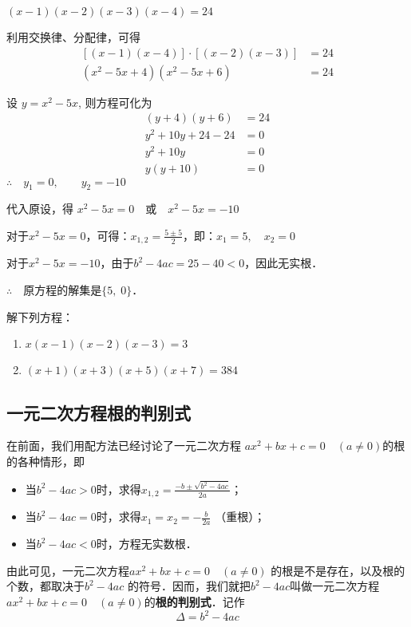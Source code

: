 \begin{solution}
    $(x-1)(x-2)(x-3)(x-4)=24$

    利用交换律、分配律，可得
    \[\begin{split}
        [(x-1)(x-4)]\cdot [(x-2)(x-3)]&=24\\
(x^2-5x+4)(x^2-5x+6)&=24
    \end{split}\]
    
    设 $y=x^2-5x$, 则方程可化为
   \[\begin{split}
       (y+4)(y+6)&=24\\
    y^2+10y+24-24&=0\\
    y^2+10y&=0\\
    y(y+10)&=0  
   \end{split}\]
   $\therefore\quad y_1=0,\qquad y_2=-10$

   代入原设，得
   $x^2-5x=0\quad \text{或}\quad    x^2-5x=-10$
   
   对于$x^2-5x=0$，可得：$x_{1,2}=\frac{5\pm 5}{2}$，即：$x_1=5,\quad x_2=0$

   对于$x^2-5x=-10$，由于$b^2-4ac=25-40<0$，因此无实根．

   $\therefore\quad $原方程的解集是$\{5,\; 0\}$．
\end{solution}

\begin{ex}
 解下列方程：   
\begin{enumerate}
    \item $x(x-1)(x-2)(x-3)=3$
    \item $(x+1)(x+3)(x+5)(x+7)=384$
\end{enumerate}
\end{ex}

\subsection{一元二次方程根的判别式}
在前面，我们用配方法已经讨论了一元二次方程
$ax^2+bx+c=0\quad (a\ne 0)$的根的各种情形，即
\begin{itemize}
    \item 当$b^2-4ac>0$时，求得$x_{1,2}=\frac{-b\pm\sqrt{b^2-4ac}}{2a}$；
\item     当$b^2-4ac=0$时，求得$x_1=x_2=-\frac{b}{2a}$ （重根）；
\item     当$b^2-4ac<0$时，方程无实数根．
\end{itemize}

由此可见，一元二次方程$ax^2+bx+c=0\quad (a\ne 0)$
的根是不是存在，以及根的个数，都取决于$b^2-4ac$
的符号．因而，我们就把$b^2-4ac$叫做一元二次方程
$ax^2+bx+c=0\quad (a\ne 0)$的\textbf{根的判别式}．记作
\[\Delta =b^2-4ac\]


